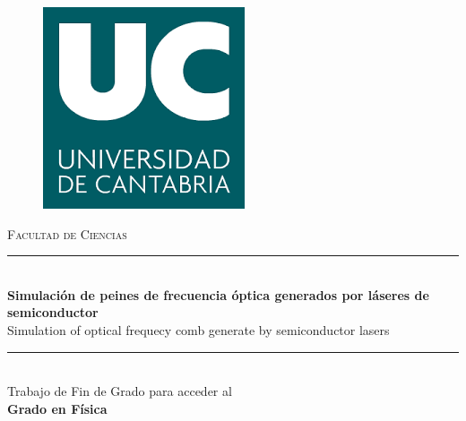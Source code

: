 \documentclass[a4paper, 11pt, oneside]{book}
\begin{document}
		\begin{titlepage} 

			\newcommand{\HRule}{\rule{\linewidth}{0.5mm}} 
			
			\center %
			
			
				
					\begin{figure}[H]
						\centering
						\includegraphics[scale=0.6]{download.png}
					\end{figure}

					\textsc{\LARGE Facultad de Ciencias}\\[1.5cm] 
			
			
			
				\HRule\\[0.4cm]
				
				{\huge\bfseries Simulación de peines de frecuencia óptica generados por láseres de semiconductor}\\[0.8cm] %

				{\huge Simulation of optical frequecy comb generate by semiconductor lasers}\\[0.4cm] %
				
				\HRule\\[1.5cm]

				{\Large Trabajo de Fin de Grado para acceder al}\\[0.4cm]

				{\LARGE\bfseries Grado en Física}\\[3cm]
			

\end{titlepage}
\end{document}

